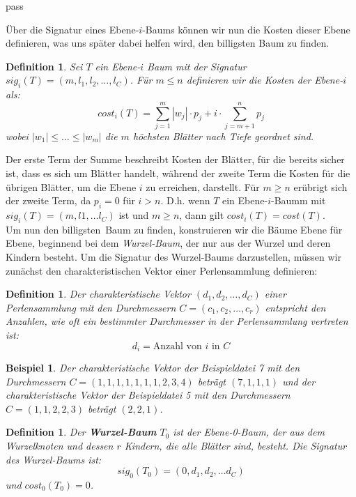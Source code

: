 pass\documentclass[a4paper,10pt,ngerman]{scrartcl}
\newtheorem{definition}[satz]{Definition}
\newtheorem{beispiel}[satz]{Beispiel}
\begin{document}
    Über die Signatur eines Ebene-$i$-Baums können wir nun die Kosten dieser Ebene definieren, was uns später dabei helfen wird, den \glqq billigsten\grqq{} Baum zu finden.
    \begin{definition}
        Sei $T$ ein Ebene-$i$ Baum mit der Signatur $sig_i(T) = (m, l_1, l_2, \dots, l_C)$. Für $m \le n$ definieren wir die Kosten der Ebene-$i$ als:
        \[cost_i(T) = \sum^m_{j=1} |w_j| \cdot p_j + i \cdot \sum^n_{j=m + 1}p_j\]
        wobei $|w_1| \le \dots \le |w_m|$ die $m$ höchsten Blätter nach Tiefe geordnet sind.
    \end{definition}
    Der erste Term der Summe beschreibt Kosten der Blätter, für die bereits sicher ist, dass es sich um Blätter handelt, während der zweite Term die Kosten für die übrigen Blätter, um die Ebene $i$ zu erreichen, darstellt.
    Für $m \ge n$ erübrigt sich der zweite Term, da $p_i = 0$ für $i > n$. D.h. wenn $T$ ein Ebene-$i$-Baumm mit $sig_i(T) = (m, l1, \dots l_C)$ ist und $m \ge n$, dann gilt $cost_i(T) = cost(T)$. \\
    Um nun den \glqq billigsten\grqq~Baum zu finden, konstruieren wir die Bäume Ebene für Ebene, beginnend bei dem \textit{Wurzel-Baum}, der nur aus der Wurzel und deren Kindern besteht.
    Um die Signatur des Wurzel-Baums darzustellen, müssen wir zunächst den charakteristischen Vektor einer Perlensammlung definieren:
    \begin{definition}
        Der charakteristische Vektor $(d_1, d_2, \dots, d_C)$ einer Perlensammlung mit den Durchmessern $C = (c_1, c_2, \dots, c_r)$ entspricht den Anzahlen, wie oft ein bestimmter Durchmesser in der Perlensammlung vertreten ist:
        \[d_i = \text{Anzahl von $i$ in $C$}\]
    \end{definition}
    \begin{beispiel}
        Der charakteristische Vektor der Beispieldatei 7 mit den Durchmessern $C = (1, 1, 1, 1, 1, 1, 1, 2, 3, 4)$ beträgt $(7, 1, 1, 1)$ und der charakteristische Vektor der Beispieldatei 5 mit den Durchmessern $C = (1, 1, 2, 2, 3)$ beträgt $(2, 2, 1)$.
    \end{beispiel}
    \begin{definition}
        Der \textbf{Wurzel-Baum} $T_0$ ist der Ebene-0-Baum, der aus dem Wurzelknoten und dessen $r$ Kindern, die alle Blätter sind, besteht.
        Die Signatur des Wurzel-Baums ist: \[sig_0(T_0) = (0, d_1, d_2, \dots d_C)\] und $cost_0(T_0) = 0$.
    \end{definition}
\end{document}

